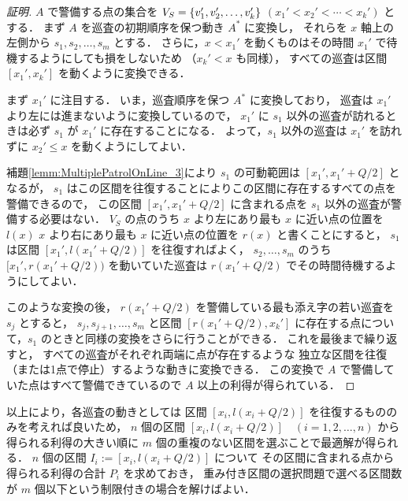\begin{proof}[証明]
	$A$ で警備する点の集合を
	$V_S = \left\{{ v_1', v_2', \ldots, v_k' }\right\}$ $( x_1' < x_2' < \cdots < x_k' )$
	とする．
	まず $A$ を巡査の初期順序を保つ動き $A^*$ に変換し，
	それらを $x$ 軸上の左側から $s_1, s_2, \ldots, s_m$ とする．
	さらに，$x < x_1'$ を動くものはその時間 $x_1'$ で待機するようにしても損をしないため
	（$x_k' < x$ も同様），
	すべての巡査は区間 $[x_1', x_k']$ を動くように変換できる．

	まず $x_1'$ に注目する．
	いま，巡査順序を保つ $A^*$ に変換しており，
	巡査は $x_1'$ より左には進まないように変換しているので，
	$x_1'$ に $s_1$ 以外の巡査が訪れるときは必ず $s_1$ が $x_1'$ に存在することになる．
	よって，$s_1$ 以外の巡査は $x_1'$ を訪れずに $x_2' \leq x$ を動くようにしてよい．

	補題\ref{lemm:MultiplePatrolOnLine_3}により $s_1$ の可動範囲は
	$[x_1', x_1' + Q/2]$ となるが，
	$s_1$ はこの区間を往復することによりこの区間に存在するすべての点を警備できるので，
	この区間 $[x_1', x_1' + Q/2]$ に含まれる点を $s_1$ 以外の巡査が警備する必要はない．
	$V_S$ の点のうち
	$x$ より左にあり最も $x$ に近い点の位置を
	$l(x)$%
	$x$ より右にあり最も $x$ に近い点の位置を
	$r(x)$%
	と書くことにすると，
	$s_1$ は区間 $[x_1', l(x_1' + Q/2)]$ を往復すればよく，
	$s_2, \ldots, s_m$ のうち
	$[x_1', r(x_1' + Q/2))$ を動いていた巡査は
	$r(x_1' + Q/2)$ でその時間待機するようにしてよい．

	このような変換の後，
	$r(x_1' + Q/2)$ を警備している最も添え字の若い巡査を $s_j$ とすると，
	$s_j, s_{j + 1}, \ldots, s_m$ と区間 $[r(x_1' + Q/2), x_k']$
	に存在する点について，$s_1$ のときと同様の変換をさらに行うことができる．
	これを最後まで繰り返すと，
	すべての巡査がそれぞれ両端に点が存在するような
	独立な区間を往復（または1点で停止）するような動きに変換できる．
	この変換で $A$ で警備していた点はすべて警備できているので $A$ 以上の利得が得られている．
\end{proof}


以上により，各巡査の動きとしては
区間 $[x_i, l(x_i + Q/2)]$ を往復するもののみを考えれば良いため，
$n$ 個の区間 $[x_i, l(x_i + Q/2)] \quad (i = 1, 2, \ldots, n)$ から
得られる利得の大きい順に $m$ 個の重複のない区間を選ぶことで最適解が得られる．
$n$ 個の区間 $I_i := [x_i, l(x_i + Q/2)]$ について
その区間に含まれる点から得られる利得の合計 $P_i$ を求めておき，
重み付き区間の選択問題で選べる区間数が $m$ 個以下という制限付きの場合を解けばよい．


